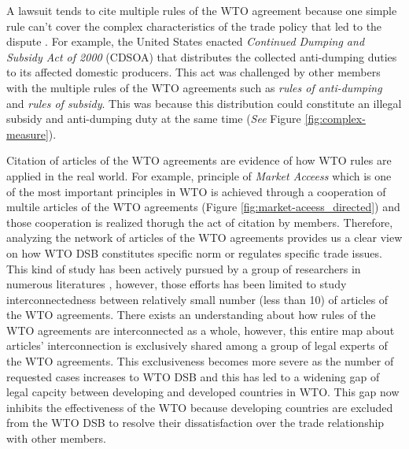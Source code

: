 A lawsuit tends to cite multiple rules of the WTO agreement because one simple rule can't cover the complex characteristics of the trade policy that led to the dispute \citep{palmeter2004dispute}.
For example, the United States enacted \textit{Continued Dumping and Subsidy Act of 2000} (CDSOA) that distributes
the collected anti-dumping duties to its affected domestic producers.
This act was challenged by other members with the multiple rules of
the WTO agreements such as \textit{rules of anti-dumping} and \textit{rules of subsidy}. This was because
this distribution could constitute an illegal subsidy and anti-dumping duty at the same time (\textit{See} Figure \ref{fig:complex-measure}).

Citation of articles of the WTO agreements are evidence of how WTO rules are applied in the real world. 
For example, principle of \textit{Market Acceess} which is one of the most important principles in WTO is achieved through a cooperation of multile articles of the WTO agreements (Figure \ref{fig:market-aceess_directed}) and those cooperation is realized thorugh the act of citation by members.
Therefore, analyzing the network of articles of the WTO agreements provides us a clear view on how WTO DSB constitutes specific norm or regulates specific trade issues. 
This kind of study has been actively pursued by a group of researchers in numerous literatures \citep{chadXXIII, charnovitz, Trachtman, who_gets}, however, those efforts has been limited to 
study interconnectedness between relatively small number (less than 10) of articles of the WTO agreements. %
There exists an understanding about how rules of the WTO agreements are interconnected as a whole, however, this entire map about articles' interconnection is exclusively shared among a group of legal experts of the WTO agreements.
This exclusiveness becomes more severe as the number of requested cases increases to WTO DSB and this has led to a widening gap of legal capcity between developing and developed countries in WTO. 
This gap now inhibits the effectiveness of the WTO because developing countries are excluded from the WTO DSB to resolve their dissatisfaction over the trade relationship with other members.



